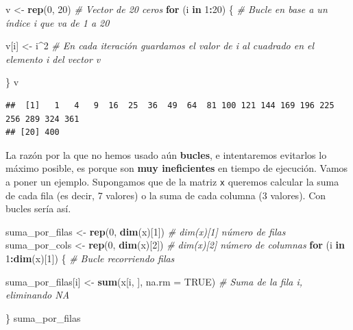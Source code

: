 \documentclass[11pt,]{book}
\newenvironment{Shaded}{\begin{snugshade}}{\end{snugshade}}
\newcommand{\CommentTok}[1]{\textcolor[rgb]{0.37,0.37,0.37}{\textit{#1}}}
\newcommand{\ControlFlowTok}[1]{\textcolor[rgb]{0.27,0.27,0.27}{\textbf{#1}}}
\newcommand{\DataTypeTok}[1]{\textcolor[rgb]{0.27,0.27,0.27}{#1}}
\newcommand{\DecValTok}[1]{\textcolor[rgb]{0.06,0.06,0.06}{#1}}
\newcommand{\KeywordTok}[1]{\textcolor[rgb]{0.27,0.27,0.27}{\textbf{#1}}}
\newcommand{\NormalTok}[1]{#1}
\newcommand{\OperatorTok}[1]{\textcolor[rgb]{0.43,0.43,0.43}{\textbf{#1}}}
\newcommand{\OtherTok}[1]{\textcolor[rgb]{0.37,0.37,0.37}{#1}}
\newcommand{\StringTok}[1]{\textcolor[rgb]{0.5,0.5,0.5}{#1}}
\begin{document}
\begin{Shaded}
\begin{Highlighting}[]
\NormalTok{v <-}\StringTok{ }\KeywordTok{rep}\NormalTok{(}\DecValTok{0}\NormalTok{, }\DecValTok{20}\NormalTok{) }\CommentTok{# Vector de 20 ceros}
\ControlFlowTok{for}\NormalTok{ (i }\ControlFlowTok{in} \DecValTok{1}\OperatorTok{:}\DecValTok{20}\NormalTok{) \{ }\CommentTok{# Bucle en base a un índice i que va de 1 a 20}

\NormalTok{  v[i] <-}\StringTok{ }\NormalTok{i}\OperatorTok{^}\DecValTok{2} \CommentTok{# En cada iteración guardamos el valor de i al cuadrado en el elemento i del vector v}
    
\NormalTok{\}}
\NormalTok{v}
\end{Highlighting}
\end{Shaded}

\begin{verbatim}
##  [1]   1   4   9  16  25  36  49  64  81 100 121 144 169 196 225 256 289 324 361
## [20] 400
\end{verbatim}

La razón por la que no hemos usado aún \textbf{bucles}, e intentaremos evitarlos lo máximo posible, es porque son \textbf{muy ineficientes} en tiempo de ejecución. Vamos a poner un ejemplo. Supongamos que de la matriz \texttt{x} queremos calcular la suma de cada fila (es decir, 7 valores) o la suma de cada columna (3 valores). Con bucles sería así.

\begin{Shaded}
\begin{Highlighting}[]
\NormalTok{suma_por_filas <-}\StringTok{ }\KeywordTok{rep}\NormalTok{(}\DecValTok{0}\NormalTok{, }\KeywordTok{dim}\NormalTok{(x)[}\DecValTok{1}\NormalTok{]) }\CommentTok{# dim(x)[1] número de filas}
\NormalTok{suma_por_cols <-}\StringTok{ }\KeywordTok{rep}\NormalTok{(}\DecValTok{0}\NormalTok{, }\KeywordTok{dim}\NormalTok{(x)[}\DecValTok{2}\NormalTok{]) }\CommentTok{# dim(x)[2] número de columnas}
\ControlFlowTok{for}\NormalTok{ (i }\ControlFlowTok{in} \DecValTok{1}\OperatorTok{:}\KeywordTok{dim}\NormalTok{(x)[}\DecValTok{1}\NormalTok{]) \{ }\CommentTok{# Bucle recorriendo filas}

\NormalTok{  suma_por_filas[i] <-}\StringTok{ }\KeywordTok{sum}\NormalTok{(x[i, ], }\DataTypeTok{na.rm =} \OtherTok{TRUE}\NormalTok{) }\CommentTok{# Suma de la fila i, eliminando NA}
    
\NormalTok{\}}
\NormalTok{suma_por_filas}
\end{Highlighting}
\end{Shaded}
\end{document}
